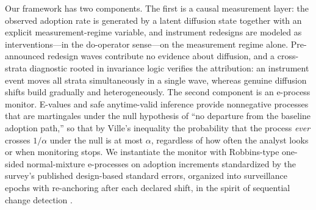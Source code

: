 \documentclass[review,authoryear,12pt]{elsarticle}
\begin{document}
Our framework has two components. The first is a causal measurement layer: the observed adoption rate is generated by a latent diffusion state together with an explicit measurement-regime variable, and instrument redesigns are modeled as interventions---in the do-operator sense---on the measurement regime alone. Pre-announced redesign waves contribute no evidence about diffusion, and a cross-strata diagnostic rooted in invariance logic \citep{peters2016,rothenhausler2021} verifies the attribution: an instrument event moves all strata simultaneously in a single wave, whereas genuine diffusion shifts build gradually and heterogeneously. The second component is an e-process monitor. E-values and safe anytime-valid inference \citep{shafer2019,vovk2021,howard2021,ramdas2023,grunwald2024} provide nonnegative processes that are martingales under the null hypothesis of ``no departure from the baseline adoption path,'' so that by Ville's inequality the probability that the process \emph{ever} crosses $1/\alpha$ under the null is at most $\alpha$, regardless of how often the analyst looks or when monitoring stops. We instantiate the monitor with Robbins-type one-sided normal-mixture e-processes \citep{robbins1970} on adoption increments standardized by the survey's published design-based standard errors, organized into surveillance epochs with re-anchoring after each declared shift, in the spirit of sequential change detection \citep{page1954,shin2023}.
\end{document}
